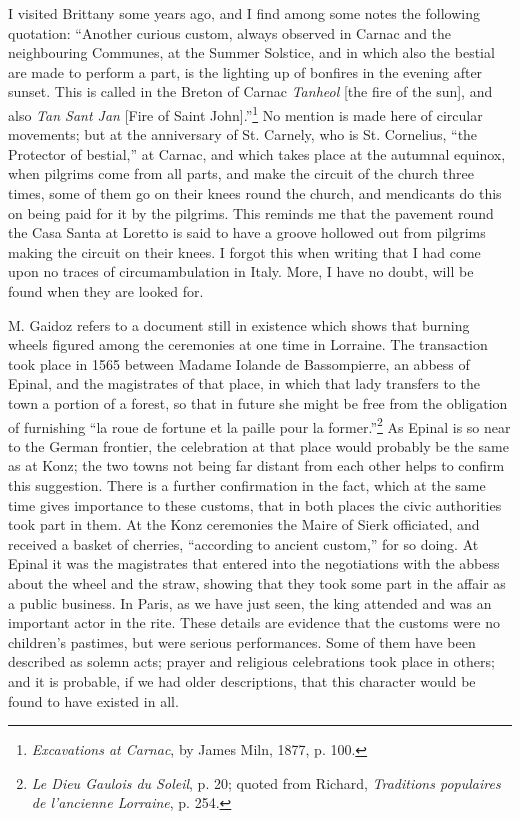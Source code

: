 \documentclass[a4paper, 11pt, oneside, polutonikogreek, english]{article}
\begin{document}
I visited Brittany some years ago, and I find among some notes the following quotation: ``Another curious custom, always observed in Carnac and the neighbouring Communes, at the Summer Solstice, and in which also the bestial are made to perform a part, is the lighting up of bonfires in the evening after sunset. This is called in the Breton of Carnac \emph{Tanheol} [the fire of the sun], and also \emph{Tan Sant Jan} [Fire of Saint John].''\footnote{\emph{Excavations at Carnac}, by James Miln, 1877, p. 100.} No mention is made here of circular movements; but at the anniversary of St. Carnely, who is St. Cornelius, ``the Protector of bestial,'' at Carnac, and which takes place at the autumnal equinox, when pilgrims come from all parts, and make the circuit of the church three times, some of them go on their knees round the church, and mendicants do this on being paid for it by the pilgrims. This reminds me that the pavement round the Casa Santa at Loretto is said to have a groove hollowed out from pilgrims making the circuit on their knees. I forgot this when writing that I had come upon no traces of circumambulation in Italy. More, I have no doubt, will be found when they are looked for.

M. Gaidoz refers to a document still in existence which shows that burning wheels figured among the ceremonies at one time in Lorraine. The transaction took place in 1565 between Madame Iolande de Bassompierre, an abbess of Epinal, and the magistrates of that place, in which that lady transfers to the town a portion of a forest, so that in future she might be free from the obligation of furnishing ``la roue de fortune et la paille pour la former.''\footnote{\emph{Le Dieu Gaulois du Soleil}, p. 20; quoted from Richard, \emph{Traditions populaires de l'ancienne Lorraine}, p. 254.} As Epinal is so near to the German frontier, the celebration at that place would probably be the same as at Konz; the two towns not being far distant from each other helps to confirm this suggestion. There is a further confirmation in the fact, which at the same time gives importance to these customs, that in both places the civic authorities took part in them. At the Konz ceremonies the Maire of Sierk officiated, and received a basket of cherries, ``according to ancient custom,'' for so doing. At Epinal it was the magistrates that entered into the negotiations with the abbess about the wheel and the straw, showing that they took some part in the affair as a public business. In Paris, as we have just seen, the king attended and was an important actor in the rite. These details are evidence that the customs were no children's pastimes, but were serious performances. Some of them have been described as solemn acts; prayer and religious celebrations took place in others; and it is probable, if we had older descriptions, that this character would be found to have existed in all.
\end{document}
